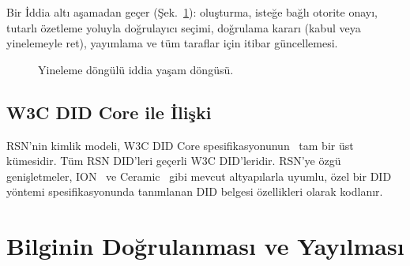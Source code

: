 \documentclass[11pt,a4paper,twocolumn]{article}
\begin{document}
Bir İddia altı aşamadan geçer (Şek.~\ref{fig:lifecycle}): oluşturma, isteğe bağlı otorite onayı, tutarlı özetleme yoluyla doğrulayıcı seçimi, doğrulama kararı (kabul veya yinelemeyle ret), yayımlama ve tüm taraflar için itibar güncellemesi.

\begin{figure}[ht]
\centering
{}
\caption{Yineleme döngülü iddia yaşam döngüsü.}
\label{fig:lifecycle}
\end{figure}

\subsection{W3C DID Core ile İlişki}

RSN'nin kimlik modeli, W3C DID Core spesifikasyonunun~\cite{did2022} tam bir üst kümesidir. Tüm RSN DID'leri geçerli W3C DID'leridir. RSN'ye özgü genişletmeler, ION~\cite{buchner2021} ve Ceramic~\cite{ceramic2023} gibi mevcut altyapılarla uyumlu, özel bir DID yöntemi spesifikasyonunda tanımlanan DID belgesi özellikleri olarak kodlanır.

\section{Bilginin Doğrulanması ve Yayılması}
\end{document}
